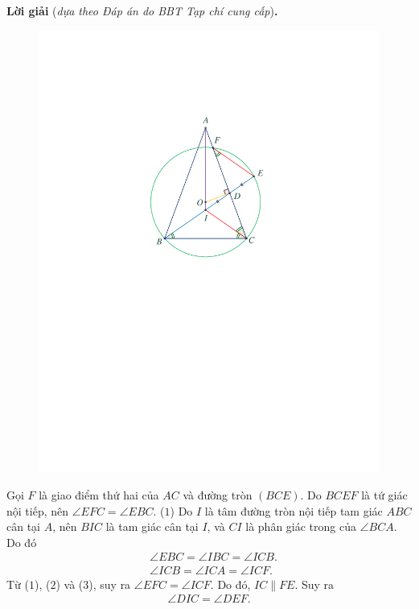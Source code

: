 \begin{multicols}{2}
	\vskip 0.05cm
	\textbf{\color{thachthuctoanhoc}Lời giải} (\textit{dựa theo Đáp án do BBT Tạp chí cung cấp})\textbf{.}
	\begin{figure}[H]
		\vspace*{-5pt}
		\centering
		\captionsetup{labelformat= empty, justification=centering}
		\includegraphics[width= 0.85\linewidth]{P584}
		\vspace*{-15pt}
	\end{figure}
	Gọi $F$ là giao điểm thứ hai của $AC$ và đường tròn $(BCE)$.
	\vskip 0.05cm
	Do $BCEF$ là tứ giác nội tiếp, nên \linebreak $\angle EFC = \angle EBC$. \hfill ($1$)
	\vskip 0.05cm
	Do $I$ là tâm đường tròn nội tiếp tam giác $ABC$ cân tại $A$, nên $BIC$ là tam giác cân tại $I$, và $CI$ là phân giác trong của $\angle BCA$.  Do đó
	\begin{align*}
		&\angle EBC = \angle IBC = \angle ICB. \tag{$2$}\\
		&\angle ICB = \angle ICA = \angle ICF. \tag{$3$}
	\end{align*}
	Từ ($1$), ($2$) và ($3$), suy ra $\angle EFC = \angle ICF$. Do đó, $IC \parallel FE$. Suy ra
	\begin{align*}
		\angle DIC = \angle DEF. \tag{$4$}

\end{align*}
\end{multicols}
